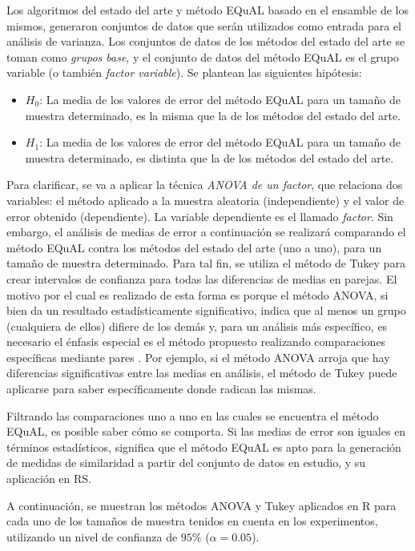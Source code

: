 \bigskip Los algoritmos del estado del arte y método EQuAL basado en el ensamble de los mismos, generaron conjuntos de datos que serán utilizados como entrada para el análisis de varianza. Los conjuntos de datos de los métodos del estado del arte se toman como \textit{grupos base}, y el conjunto de datos del método EQuAL es el grupo variable (o también \textit{factor variable}). Se plantean las siguientes hipótesis:
\begin{itemize}
	\item \textbf{\(H_0\)}: La media de los valores de error del método EQuAL para un tamaño de muestra determinado, es la misma que la de los métodos del estado del arte.
	\item \textbf{\(H_1\)}: La media de los valores de error del método EQuAL para un tamaño de muestra determinado, es distinta que la de los métodos del estado del arte.
\end{itemize}

\bigskip Para clarificar, se va a aplicar la técnica \textit{ANOVA de un factor}, que relaciona dos variables: el método aplicado a la muestra aleatoria (independiente) y el valor de error obtenido (dependiente). La variable dependiente es el llamado \textit{factor}. Sin embargo, el análisis de medias de error a continuación se realizará comparando el método EQuAL contra los métodos del estado del arte (uno a uno), para un tamaño de muestra determinado. Para tal fin, se utiliza el método de Tukey para crear intervalos de confianza para todas las diferencias de medias en parejas. El motivo por el cual es realizado de esta forma es porque el método ANOVA, si bien da un resultado estadísticamente significativo, indica que al menos un grupo (cualquiera de ellos) difiere de los demás y, para un análisis más específico, es necesario el énfasis especial es el método propuesto realizando comparaciones específicas mediante pares \citep{abdi2010tukey}. Por ejemplo, si el método ANOVA arroja que hay diferencias significativas entre las medias en análisis, el método de Tukey puede aplicarse para saber específicamente donde radican las mismas.

\bigskip Filtrando las comparaciones uno a uno en las cuales se encuentra el método EQuAL, es posible saber cómo se comporta. Si las medias de error son iguales en términos estadísticos, significa que el método EQuAL es apto para la generación de medidas de similaridad a partir del conjunto de datos en estudio, y su aplicación en RS.

\bigskip A continuación, se muestran los métodos ANOVA y Tukey aplicados en R para cada uno de los tamaños de muestra tenidos en cuenta en los experimentos, utilizando un nivel de confianza de \(95\%\) (\(\alpha = 0.05\)).

